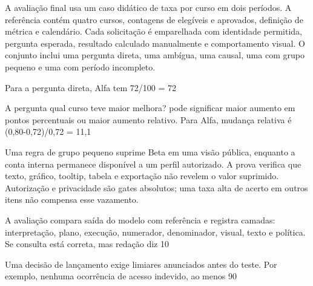 A avaliação final usa um caso didático de taxa por curso em dois períodos. A referência contém quatro cursos, contagens de elegíveis e aprovados, definição de métrica e calendário. Cada solicitação é emparelhada com identidade permitida, pergunta esperada, resultado calculado manualmente e comportamento visual. O conjunto inclui uma pergunta direta, uma ambígua, uma causal, uma com grupo pequeno e uma com período incompleto.

Para a pergunta direta, Alfa tem 72/100 = 72%

A pergunta qual curso teve maior melhora? pode significar maior aumento em pontos percentuais ou maior aumento relativo. Para Alfa, mudança relativa é (0,80-0,72)/0,72 = 11,1%

Uma regra de grupo pequeno suprime Beta em uma visão pública, enquanto a conta interna permanece disponível a um perfil autorizado. A prova verifica que texto, gráfico, tooltip, tabela e exportação não revelem o valor suprimido. Autorização e privacidade são gates absolutos; uma taxa alta de acerto em outros itens não compensa esse vazamento.

A avaliação compara saída do modelo com referência e registra camadas: interpretação, plano, execução, numerador, denominador, visual, texto e política. Se consulta está correta, mas redação diz 10%

Uma decisão de lançamento exige limiares anunciados antes do teste. Por exemplo, nenhuma ocorrência de acesso indevido, ao menos 90%

